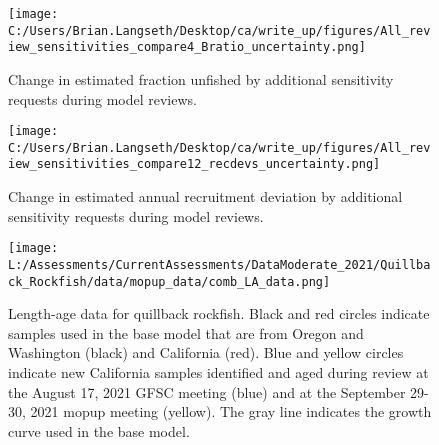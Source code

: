 \documentclass[11pt,
  english,
  letterpaper,
]{article}
\begin{document}
\tagmcend\tagstructend


\begin{figure}
\centering
\texttt{[image: C:/Users/Brian.Langseth/Desktop/ca/write\_up/figures/All\_review\_sensitivities\_compare4\_Bratio\_uncertainty.png]}
\caption{Change in estimated fraction unfished by additional sensitivity requests during model reviews.\label{fig:review-sens-depl}}
\end{figure}

\tagmcend\tagstructend


\begin{figure}
\centering
\texttt{[image: C:/Users/Brian.Langseth/Desktop/ca/write\_up/figures/All\_review\_sensitivities\_compare12\_recdevs\_uncertainty.png]}
\caption{Change in estimated annual recruitment deviation by additional sensitivity requests during model reviews.\label{fig:review-sens-recdev}}
\end{figure}

\tagmcend\tagstructend


\begin{figure}
\centering
\texttt{[image: L:/Assessments/CurrentAssessments/DataModerate\_2021/Quillback\_Rockfish/data/mopup\_data/comb\_LA\_data.png]}
\caption{Length-age data for quillback rockfish. Black and red circles indicate samples used in the base model that are from Oregon and Washington (black) and California (red). Blue and yellow circles indicate new California samples identified and aged during review at the August 17, 2021 GFSC meeting (blue) and at the September 29-30, 2021 mopup meeting (yellow). The gray line indicates the growth curve used in the base model.\label{fig:review-length-age}}
\end{figure}

\tagmcend\tagstructend
\end{document}
